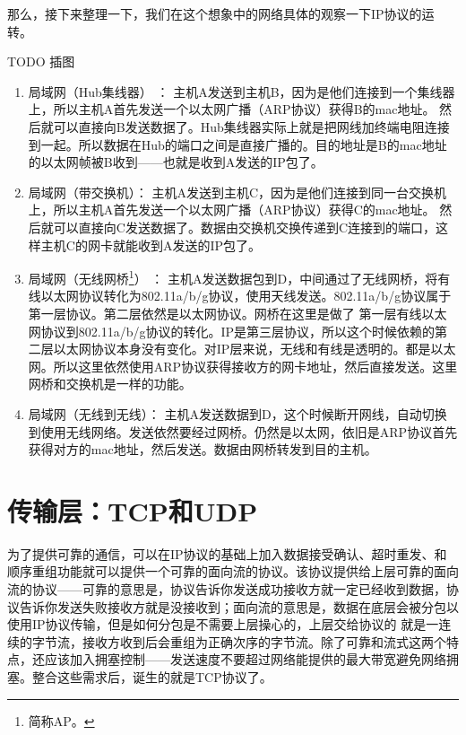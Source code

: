 那么，接下来整理一下，我们在这个想象中的网络具体的观察一下IP协议的运转。

TODO 插图

\begin{enumerate}

\item 局域网（Hub集线器） ： 主机A发送到主机B，因为是他们连接到一个集线器上，所以主机A首先发送一个以太网广播（ARP协议）获得B的mac地址。
然后就可以直接向B发送数据了。Hub集线器实际上就是把网线加终端电阻连接到一起。所以数据在Hub的端口之间是直接广播的。目的地址是B的mac地址的以太网帧被B收到——也就是收到A发送的IP包了。

\item 局域网（带交换机）： 主机A发送到主机C，因为是他们连接到同一台交换机上，所以主机A首先发送一个以太网广播（ARP协议）获得C的mac地址。
然后就可以直接向C发送数据了。数据由交换机交换传递到C连接到的端口，这样主机C的网卡就能收到A发送的IP包了。

\item 局域网（无线网桥\footnote{简称AP。}） ： 主机A发送数据包到D，中间通过了无线网桥，将有线以太网协议转化为802.11a/b/g协议，使用天线发送。802.11a/b/g协议属于第一层协议。第二层依然是以太网协议。网桥在这里是做了
第一层有线以太网协议到802.11a/b/g协议的转化。IP是第三层协议，所以这个时候依赖的第二层以太网协议本身没有变化。对IP层来说，无线和有线是透明的。都是以太网。所以这里依然使用ARP协议获得接收方的网卡地址，然后直接发送。这里网桥和交换机是一样的功能。

\item 局域网（无线到无线）： 主机A发送数据到D，这个时候断开网线，自动切换到使用无线网络。发送依然要经过网桥。仍然是以太网，依旧是ARP协议首先获得对方的mac地址，然后发送。数据由网桥转发到目的主机。

\end{enumerate}

\section{传输层：TCP和UDP}
为了提供可靠的通信，可以在IP协议的基础上加入数据接受确认、超时重发、和顺序重组功能就可以提供一个可靠的面向流的协议。该协议提供给上层可靠的面向流的协议——可靠的意思是，协议告诉你发送成功接收方就一定已经收到数据，协议告诉你发送失败接收方就是没接收到；面向流的意思是，数据在底层会被分包以使用IP协议传输，但是如何分包是不需要上层操心的，上层交给协议的 就是一连续的字节流，接收方收到后会重组为正确次序的字节流。除了可靠和流式这两个特点，还应该加入拥塞控制——发送速度不要超过网络能提供的最大带宽避免网络拥塞。整合这些需求后，诞生的就是TCP协议了。

